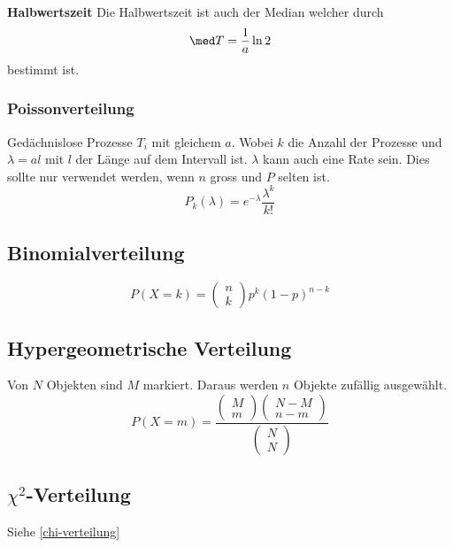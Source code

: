 \textbf{Halbwertszeit}
Die Halbwertszeit ist auch der Median welcher durch 
\[
\med T = \frac{1}{a}\ln2
\]
bestimmt ist.

\subsubsection{Poissonverteilung}
Gedächnislose Prozesse $T_i$ mit gleichem $a$. Wobei $k$ die Anzahl der Prozesse und $\lambda = al$ mit $l$ der Länge auf dem Intervall ist. $\lambda$ kann auch eine Rate sein. Dies sollte nur verwendet werden, wenn $n$ gross und $P$ selten ist.
\[
P_k(\lambda) = e^{-\lambda}\frac{\lambda^k}{k!}
\]


\subsection{Binomialverteilung}
\[
P(X = k) = \begin{pmatrix}	n \\ k \end{pmatrix} p^k(1-p)^{n-k}
\]

\subsection{Hypergeometrische Verteilung}
Von $N$ Objekten sind $M$ markiert. Daraus werden $n$ Objekte zufällig ausgewählt.
\[
P(X=m) = \frac{\begin{pmatrix}	M \\ m\end{pmatrix}\begin{pmatrix}	N-M \\ n-m\end{pmatrix}}{\begin{pmatrix} N \\ N\end{pmatrix}}
\]

\subsection{$\chi^2$-Verteilung}
Siehe \ref{chi-verteilung}